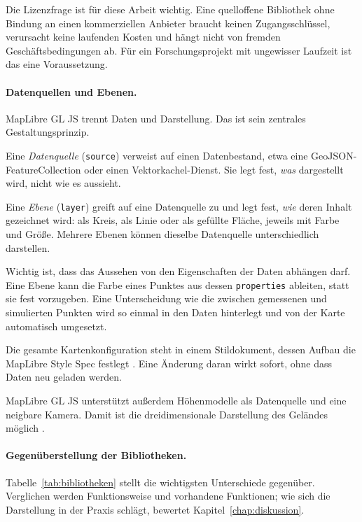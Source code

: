 \documentclass[12pt,a4paper]{report}
\begin{document}
Die Lizenzfrage ist für diese Arbeit wichtig. Eine quelloffene Bibliothek ohne Bindung an
einen kommerziellen Anbieter braucht keinen Zugangsschlüssel, verursacht keine laufenden
Kosten und hängt nicht von fremden Geschäftsbedingungen ab. Für ein Forschungsprojekt mit
ungewisser Laufzeit ist das eine Voraussetzung.

\paragraph{Datenquellen und Ebenen.}

MapLibre GL JS trennt Daten und Darstellung. Das ist sein zentrales Gestaltungsprinzip.

Eine \emph{Datenquelle} (\texttt{source}) verweist auf einen Datenbestand, etwa eine
GeoJSON-FeatureCollection oder einen Vektorkachel-Dienst. Sie legt fest, \emph{was}
dargestellt wird, nicht wie es aussieht.

Eine \emph{Ebene} (\texttt{layer}) greift auf eine Datenquelle zu und legt fest, \emph{wie}
deren Inhalt gezeichnet wird: als Kreis, als Linie oder als gefüllte Fläche, jeweils mit
Farbe und Größe. Mehrere Ebenen können dieselbe Datenquelle unterschiedlich darstellen.

Wichtig ist, dass das Aussehen von den Eigenschaften der Daten abhängen darf. Eine Ebene
kann die Farbe eines Punktes aus dessen \texttt{properties} ableiten, statt sie fest
vorzugeben. Eine Unterscheidung wie die zwischen gemessenen und simulierten Punkten wird so
einmal in den Daten hinterlegt und von der Karte automatisch umgesetzt.

Die gesamte Kartenkonfiguration steht in einem Stildokument, dessen Aufbau die MapLibre
Style Spec festlegt \cite{MapLibreStyleSpec}. Eine Änderung daran wirkt sofort, ohne dass
Daten neu geladen werden.

MapLibre GL JS unterstützt außerdem Höhenmodelle als Datenquelle und eine neigbare Kamera.
Damit ist die dreidimensionale Darstellung des Geländes möglich \cite{MapLibreDocs}.

\paragraph{Gegenüberstellung der Bibliotheken.}
\label{subsec:vergleich}

Tabelle~\ref{tab:bibliotheken} stellt die wichtigsten Unterschiede gegenüber. Verglichen
werden Funktionsweise und vorhandene Funktionen; wie sich die Darstellung in der Praxis
schlägt, bewertet Kapitel~\ref{chap:diskussion}.
\end{document}
